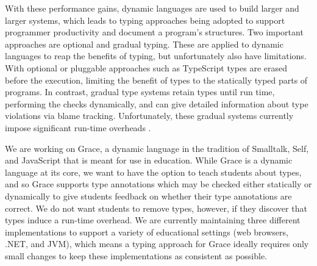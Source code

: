 With these performance gains,
dynamic languages are used to build larger and larger systems,
which leads to typing approaches being adopted
to support programmer productivity and document a program's structures.
Two important approaches are optional\citep{GiladPluggable2004}
and gradual typing\citep{Siek2006,Siek2015}.
These are applied to dynamic languages to reap the benefits of typing, but
unfortunately also have limitations.
With optional or pluggable approaches such as 
TypeScript\citep{typeScriptECOOP,GiladPluggable2004}
%
types are erased before the execution,
limiting the benefit of types to the statically typed parts of programs.
In contrast, gradual type systems retain types until run time,
performing the checks dynamically, and
can give detailed information about type violations via blame 
tracking\citep{Siek2015,blame2009}.
Unfortunately, these gradual systems currently impose significant
run-time overheads
\citep{Takikawa2016,Vitousek2017,Muehlboeck2017,Bauman2017,Richards2017,Stulova2016,Greenman2018}.


We are working on Grace\citep{graceOnward12}, a dynamic language in
the tradition of Smalltalk\citep{bluebook}, Self\citep{Self}, and
JavaScript that is meant for use in
education\citep{graceSigcse13}.  While Grace is a dynamic language at
its core, we want to have the option to teach students about types,
and so Grace supports type annotations which may be checked either
statically or dynamically to give students feedback on whether their
type annotations are correct.  We do not want students to remove
types, however, if they discover that types induce a run-time
overhead. We are currently maintaining three different
implementations to support a variety of educational settings
(web browsers, .NET, and JVM),
which means a typing approach for Grace ideally requires
only small changes to keep these implementations as consistent as
possible.

